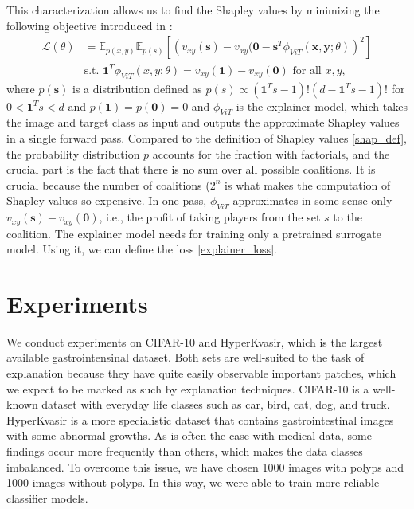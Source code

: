 \documentclass[en]{pracamgr}
\begin{document}
This characterization allows us to find the Shapley values by minimizing the following objective introduced in \cite{DBLP:conf/iclr/JethaniSCLR22}:
\begin{equation}
    \begin{split}
        \mathcal{L}(\theta) &= \mathbb{E}_{p(x,y)} \mathbb{E}_{p(s)}  \left[\left(v_{xy}(\mathbf{s})-v_{xy}(\mathbf{0} -\mathbf{s}^T \phi _{ViT}(\mathbf{x},\mathbf{y};\theta)\right)^2\right]
        \\
        &    \textrm{s.t.  } \mathbf{1}^T \phi _{ViT}(x,y;\theta) = v_{xy}(\mathbf{1}) - v_{xy}(\mathbf{0}) \textrm{    for all   } x,y,
    \end{split}
\label{explainer_loss}\end{equation}
where $p(\mathbf{s})$ is a distribution defined as $p(s) \propto (\mathbf{1}^Ts - 1)! (d - \mathbf{1}^Ts -1)!$ for $0 < \mathbf{1}^Ts < d$ and $p(\mathbf{1}) = p(\mathbf{0}) = 0$ and $\phi _{ViT}$ is the explainer model, which takes the image and target class as input and outputs the approximate Shapley values in a single forward pass. Compared to the definition of Shapley values \ref{shap_def}, the probability distribution $p$ accounts for the fraction with factorials, and the crucial part is the fact that there is no sum over all possible coalitions. It is crucial because the number of coalitions ($2^n$ is what makes the computation of Shapley values so expensive. In one pass, $\phi _{ViT}$ approximates in some sense only $v_{xy}(\mathbf{s})-v_{xy}(\mathbf{0})$, i.e., the profit of taking players from the set $s$ to the coalition. The explainer model needs for training only a pretrained surrogate model. Using it, we can define the loss \ref{explainer_loss}.




\chapter{Experiments}\label{r:experiments}
We conduct experiments on CIFAR-10 and HyperKvasir, which is the largest available gastrointensinal dataset. Both sets are well-suited to the task of explanation because they have quite easily observable important patches, which we expect to be marked as such by explanation techniques. CIFAR-10 is a well-known dataset with everyday life classes such as car, bird, cat, dog, and truck.
HyperKvasir is a more specialistic dataset that contains gastrointestinal images with some abnormal growths.
As is often the case with medical data, some findings occur more frequently than others, which makes the data classes imbalanced. To overcome this issue, we have chosen 1000 images with polyps and 1000 images without polyps. In this way, we were able to train more reliable classifier models.
\end{document}
